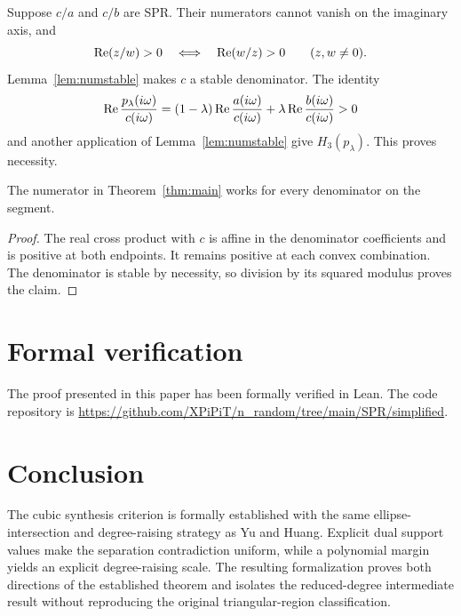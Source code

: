 \documentclass[11pt]{article}
\begin{document}
Suppose $c/a$ and $c/b$ are SPR. Their numerators cannot vanish on the imaginary axis, and
\[
 \operatorname{Re}(z/w)>0\quad\Longleftrightarrow\quad\operatorname{Re}(w/z)>0
 \qquad(z,w\ne0).
\]
Lemma~\ref{lem:numstable} makes $c$ a stable denominator. The identity
\[
 \operatorname{Re}\frac{p_\lambda(i\omega)}{c(i\omega)}
 =(1-\lambda)\operatorname{Re}\frac{a(i\omega)}{c(i\omega)}
 +\lambda\operatorname{Re}\frac{b(i\omega)}{c(i\omega)}>0
\]
and another application of Lemma~\ref{lem:numstable} give $H_3(p_\lambda)$. This proves necessity.

\begin{corollary}
The numerator in Theorem~\ref{thm:main} works for every denominator on the segment.
\end{corollary}
\begin{proof}
The real cross product with $c$ is affine in the denominator coefficients and is positive at both endpoints. It remains positive at each convex combination. The denominator is stable by necessity, so division by its squared modulus proves the claim.
\end{proof}

\section{Formal verification}
The proof presented in this paper has been formally verified in Lean. The code repository is \url{https://github.com/XPiPiT/n_random/tree/main/SPR/simplified}.

\section{Conclusion}
The cubic synthesis criterion is formally established with the same ellipse-intersection and degree-raising strategy as Yu and Huang. Explicit dual support values make the separation contradiction uniform, while a polynomial margin yields an explicit degree-raising scale. The resulting formalization proves both directions of the established theorem and isolates the reduced-degree intermediate result without reproducing the original triangular-region classification.



\end{document}
